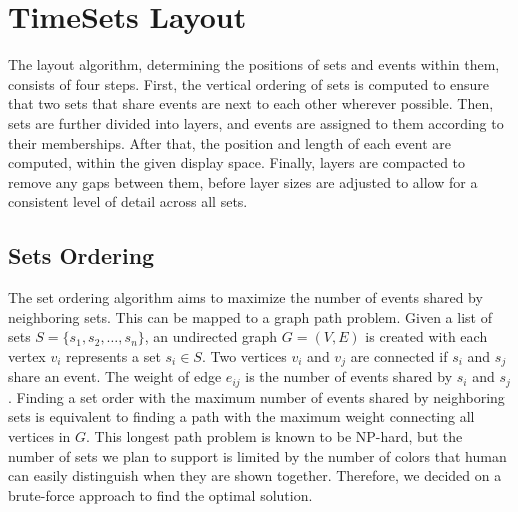 \section{TimeSets Layout}

The layout algorithm, determining the positions of sets and events within them,  consists of four steps. First, the vertical ordering of sets is computed to ensure that two sets that share events are next to each other wherever possible. Then, sets are further divided into layers, and events are assigned to them according to their memberships. After that, the position and length of each event are computed, within the given display space. Finally, layers are compacted to remove any gaps between them, before layer sizes are adjusted to allow for a consistent level of detail across all sets. 

\subsection{Sets Ordering}
\label{sec:set-ordering}
The set ordering algorithm aims to maximize the number of events shared by neighboring sets. This can be mapped to a graph path problem. Given a list of sets $S=\{s_1, s_2, \dotsc, s_n\}$, an undirected graph $G = (V,E)$ is created with each vertex $v_i$ represents a set $s_i \in S$. Two vertices $v_i$ and $v_j$ are connected if $s_i$ and $s_j$ share an event. The weight of edge $e_{ij}$ is the number of events shared by $s_i$ and $s_j$. Finding a set order with the maximum number of events shared by neighboring sets is equivalent to finding a path with the maximum weight connecting all vertices in $G$. This longest path problem is known to be NP-hard, but the number of sets we plan to support is limited by the number of colors that human can easily distinguish when they are shown together. Therefore, we decided on a brute-force approach to find the optimal solution.

